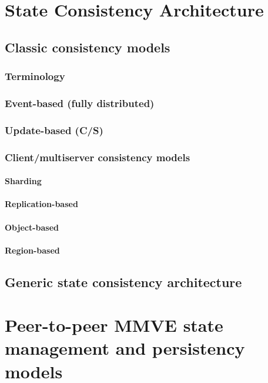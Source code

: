 \chapter{State Consistency Architecture}
\label{chp:CONSISTENCY}

    \section{Classic consistency models}

        \subsection{Terminology}
        \subsection{Event-based (fully distributed)}
        \subsection{Update-based (C/S)}
        \subsection{Client/multiserver consistency models}
            \subsubsection{Sharding}
            \subsubsection{Replication-based}
            \subsubsection{Object-based}
            \subsubsection{Region-based}

    \section{Generic state consistency architecture}

\chapter{Peer-to-peer MMVE state management and persistency models}

